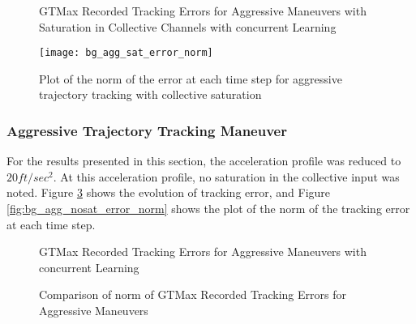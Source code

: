 \begin{figure}[h]
\centering
{}
\caption{GTMax Recorded Tracking Errors for Aggressive Maneuvers with Saturation in Collective Channels with concurrent Learning}
\label{fig:oval_sat_errors}
\end{figure}

\begin{figure}[h]
\centering
\texttt{[image: bg\_agg\_sat\_error\_norm]}
\caption{Plot of the norm of the error at each time step for aggressive trajectory tracking with collective saturation}
\label{fig:bg_agg_Sat_error_norm}
\end{figure}

\subsubsection{Aggressive Trajectory Tracking Maneuver}
For the results presented in this section, the acceleration profile was reduced to $20ft/sec^2$. At this acceleration profile, no saturation in the collective input was noted. Figure \ref{fig:oval_nosat_errors} shows the evolution of tracking error, and Figure \ref{fig:bg_agg_nosat_error_norm} shows the plot of the norm of the tracking error at each time step.
\begin{figure}[h]
\centering
{}
\caption{GTMax Recorded Tracking Errors for Aggressive Maneuvers with concurrent Learning}
\label{fig:oval_nosat_errors}
\end{figure}

\begin{figure}[h]
\centering
{}
\caption{Comparison of norm of GTMax Recorded Tracking Errors for Aggressive Maneuvers}
\label{fig:oval_comparision_error_norm}
\end{figure}


